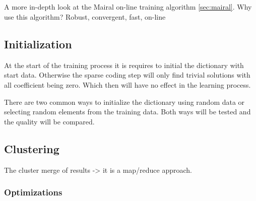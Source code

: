 \subsection{\trainDL}
A more in-depth look at the Mairal on-line training algorithm \ref{sec:mairal}. 
Why use this algorithm? Robust, convergent, fast, on-line

\subsection{Initialization}
At the start of the training process it is requires to initial the
dictionary with start data. Otherwise the sparse coding step will only find
trivial solutions with all coefficient being zero. Which then will have no
effect in the learning process.

There are two common ways to initialize the dictionary using random data or
selecting random elements from the training data. Both ways will be tested and 
the quality will be compared.

\subsection{Clustering}

The cluster merge of results -> 
it is a map/reduce approach. 


\subsubsection*{Optimizations}

